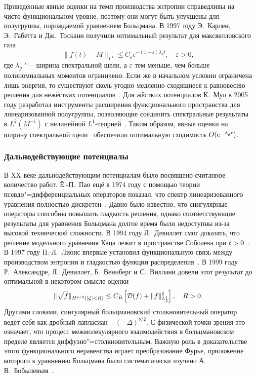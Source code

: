 Приведённые явные оценки на темп производства энтропии справедливы на чисто функциональном уровне,
поэтому они могут быть улучшены для полугруппы, порождаемой уравнением Больцмана.
В 1997 году Э.~Карлен, Э.~Габетта и Дж.~Тоскани получили оптимальный результат для максвелловского газа~\cite{Carlen1999}
\begin{equation*}
    \|f(t) - M\|_{L^1} \leq C_\varepsilon e^{-(1-\varepsilon)\lambda_g t}, \quad \varepsilon > 0,
\end{equation*}
где \(\lambda_g\) "--- ширина спектральной щели, а \(\varepsilon\) тем меньше,
чем больше полиномиальных моментов ограничено.
Если же в начальном условии ограничена лишь энергия, то существуют сколь угодно медленно сходящиеся к равновесию
решения для нежёстких потенциалов~\cite{Carlen2003, Carlen2009}.
Для жёстких потенциалов К.~Муо в 2005 году разработал инструменты расширения функционального пространства для линеаризованной полугруппы,
позволяющие соединить спектральные результаты в \(L^2(M^{-1})\) с нелинейной \(L^1\)-теорией~\cite{Mouhot2006}.
Таким образом, явные оценки на ширину спектральной щели~\cite{Baranger2005}
обеспечили оптимальную сходимость \(O(e^{-\lambda_g t})\).

\subsubsection{Дальнодействующие потенциалы}

В XX веке дальнодействующим потенциалам было посвящено считанное количество работ.
Ё.-П.~Пао ещё в 1974 году с помощью теории псевдо"=дифференциальных операторов показал,
что спектр линеаризованного уравнения полностью дискретен~\cite{Pao1974}.
Давно было известно, что сингулярные операторы способны повышать гладкость решения,
однако соответствующие результаты для уравнения Больцмана долгое время были недоступны
из-за высокой технической сложности.
В 1994 году Л.~Девиллет смог доказать, что решение модельного уравнения Каца лежит
в пространстве Соболева при \(t>0\)~\cite{Desvillettes1995}.
В 1997 году П.-Л.~Лионс впервые установил функциональную связь между производством энтропии
и гладкостью функции распределения~\cite{Lions1998}.
В 1999 году Р.~Александре, Л.~Девиллет, Б.~Веннберг и С.~Виллани довели этот результат до оптимальной
в некотором смысле оценки~\cite{Alexandre2000}
\begin{equation*}
    \|\sqrt{f}\|_{H^{\nu/2}(|{\boldsymbol{\zeta}}|<R)} \leq C_R \left[ \mathcal{D}(f) + \|f\|^2_{L_2^1} \right], \quad R > 0.
\end{equation*}
Другими словами, сингулярный больцмановский столкновительный оператор ведёт себя
как дробный лапласиан \(-(-\Delta)^{\nu/2}\).
С физической точки зрения это означает, что процесс межмолекулярного взаимодействия в больцмановском пределе
является диффузно"=столкновительным.
Важную роль в доказательстве этого функционального неравенства играет преобразование Фурье,
приложение которого к уравнению Больцмана было систематически изучено А.\,В.~Бобылевым~\cite{Bobylev1984}.

